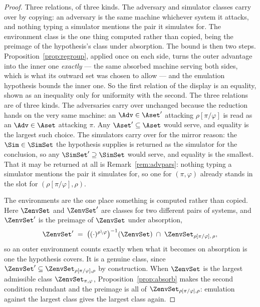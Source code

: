 \documentclass[10pt,oneside,openany]{book}
\theoremstyle{accentdef}
\theoremstyle{accentplain}
\begin{document}
\begin{proof}
Three relations, of three kinds. The adversary and simulator classes carry over by copying: an
adversary is the same machine whichever system it attacks, and nothing typing a simulator mentions
the pair it simulates for. The environment class is the one thing computed rather than copied,
being the preimage of the hypothesis's class under absorption. The bound is then two steps.
Proposition~\ref{prop:regroup}, applied once on each side, turns the outer advantage into the inner
one \emph{exactly} --- the same absorbed machine serving both sides, which is what its outward set
was chosen to allow --- and the emulation hypothesis bounds the inner one. So the first relation of
the display is an equality, shown as an inequality only for uniformity with the second.
The three relations are of three kinds. The adversaries carry over unchanged because the
reduction hands on the very same machine: an $\Adv \in \Aset'$ attacking $\rho[\pi/\varphi]$ is
read as an $\Adv \in \Aset$ attacking $\pi$. Any $\Aset' \subseteq \Aset$ would serve, and
equality is the largest such choice. The simulators carry over for the mirror reason: the
$\Sim \in \SimSet$ the hypothesis supplies is returned as the simulator for the conclusion, so
any $\SimSet' \supseteq \SimSet$ would serve, and equality is the smallest. That it may be
returned at all is Remark~\ref{rem:advpars}: nothing typing a simulator mentions the pair it
simulates for, so one for $(\pi,\varphi)$ already stands in the slot for
$(\rho[\pi/\varphi],\rho)$.

The environments are the one place something is computed rather than copied. Here $\ZenvSet$ and
$\ZenvSet'$ are classes for two different pairs of systems, and $\ZenvSet'$ is the preimage of
$\ZenvSet$ under absorption,
\[
  \ZenvSet' \;=\; \bigl((\cdot)^{\rho \setminus \varphi}\bigr)^{-1}(\ZenvSet) \;\cap\; \ZenvSet_{\rho[\pi/\varphi],\,\rho} ,
\]
so an outer environment counts exactly when what it becomes on absorption is one the hypothesis
covers. It is a genuine class, since $\ZenvSet' \subseteq \ZenvSet_{\rho[\pi/\varphi],\rho}$ by
construction. When $\ZenvSet$ is the largest admissible class $\ZenvSet_{\pi,\varphi}$,
Proposition~\ref{prop:absorb} makes the second condition redundant and the preimage is all of
$\ZenvSet_{\rho[\pi/\varphi],\rho}$: emulation against the largest class gives the largest class
again.


\end{proof}
\end{document}

